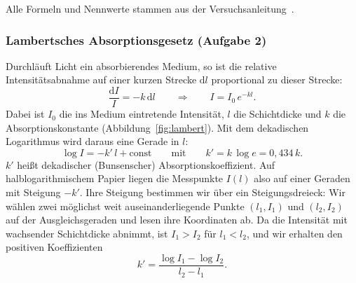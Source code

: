 \documentclass{article}
\let\OrigRef\ref
\renewcommand{\ref}[1]{{\color{linkblue}\uline{\OrigRef{#1}}}}
\begin{document}
Alle Formeln und Nennwerte stammen aus der Versuchsanleitung~\cite{anleitung}.

\subsubsection{Lambertsches Absorptionsgesetz (Aufgabe 2)}
\label{sec:lambert}

Durchläuft Licht ein absorbierendes Medium, so ist die relative Intensitätsabnahme auf
einer kurzen Strecke $\mathrm{d}l$ proportional zu dieser Strecke:
\begin{equation}
	\frac{\mathrm{d}I}{I} = -k\,\mathrm{d}l
	\qquad\Longrightarrow\qquad
	I = I_0\,e^{-kl} .
	\label{eq:lambert}
\end{equation}
Dabei ist $I_0$ die ins Medium eintretende Intensität, $l$ die Schichtdicke und $k$ die
Absorptionskonstante (Abbildung~\ref{fig:lambert}). Mit dem dekadischen Logarithmus wird
daraus eine Gerade in $l$:
\begin{equation}
	\log I = -k'\,l + \text{const}
	\qquad\text{mit}\qquad
	k' = k\,\log e = 0{,}434\,k .
	\label{eq:lambert_log}
\end{equation}
$k'$ heißt dekadischer (Bunsenscher) Absorptionskoeffizient. Auf halblogarithmischem
Papier liegen die Messpunkte $I(l)$ also auf einer Geraden mit Steigung $-k'$.
Ihre Steigung bestimmen wir über ein Steigungsdreieck: Wir wählen zwei möglichst weit
auseinanderliegende Punkte $(l_1, I_1)$ und $(l_2, I_2)$ auf der Ausgleichsgeraden und
lesen ihre Koordinaten ab. Da die Intensität mit wachsender Schichtdicke abnimmt, ist
$I_1 > I_2$ für $l_1 < l_2$, und wir erhalten den positiven Koeffizienten
\begin{equation}
	k' = \frac{\log I_1 - \log I_2}{l_2 - l_1} .
	\label{eq:kstrich_steigung}
\end{equation}
\end{document}

